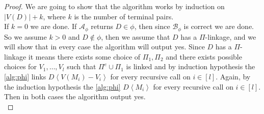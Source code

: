 \begin{proof}
    We are going to show that the algorithm works by induction on $|V(D)|+k$, where $k$ is the number of terminal pairs.\\
    If $k=0$ we are done.
    If $\mathcal{A}_\phi$ returns $D\in \phi$, then since $\mathcal{B}_\phi$ is correct we are done.
    So we assume $k>0$ and $D\notin \phi$, then we assume that $D$ has a $\Pi$-linkage, and we will show that in every case the algorithm will output yes.
    Since $D$ has a $\Pi$-linkage it means there exists some choice of $\Pi_1,\Pi_2$ and there exists possible choices for $V_1,\dots ,V_l$ such that $\Pi^e\cup \Pi_1$ is linked and by induction hypothesis the \autoref{alg:phi} links $D\left<V(M_i)-V_i \right>$ for every recursive call on $i\in [l]$.
    Again, by the induction hypothesis the \autoref{alg:phi} $D\left< M_i\right>$ for every recursive call on $i\in [l]$. Then in both cases the algorithm output yes.\\


\end{proof}
